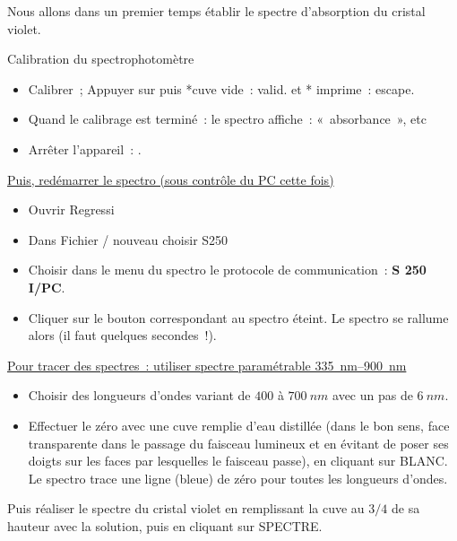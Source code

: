 \documentclass[a4paper, 11pt, final, garamond]{book}
\begin{document}
Nous allons dans un premier temps établir le spectre d'absorption du cristal violet. 

\begin{instruc}{Calibration du spectrophotomètre}
    \begin{itemize}
        \item Calibrer~; Appuyer sur  puis   *cuve vide~: valid. et *
            imprime~: escape.
        \item Quand le calibrage est terminé~: le spectro affiche~:
            «~absorbance~», etc
        \item Arrêter l'appareil~: .
    \end{itemize}
\end{instruc}

\underline{Puis, redémarrer le spectro (sous contrôle du PC cette fois)}
\begin{itemize}
    \item Ouvrir Regressi
    \item Dans Fichier / nouveau choisir S250
    \item Choisir dans le menu du spectro le protocole de communication~:
        \textbf{S 250 I/PC}.
    \item Cliquer sur le bouton correspondant au spectro éteint. Le spectro se
        rallume alors (il faut quelques secondes~!).
\end{itemize}

\underline{Pour tracer des spectres~: utiliser spectre paramétrable
\SIrange{335}{900}{nm}}
\begin{itemize}
    \item Choisir des longueurs d'ondes variant de $400$ à $\SI{700}{nm}$ avec
        un pas de $\SI{6}{nm}$.
    \item Effectuer le zéro avec une cuve remplie d'eau distillée (dans le bon
        sens, face transparente dans le passage du faisceau lumineux et en
        évitant de poser ses doigts sur les faces par lesquelles le faisceau
        passe), en cliquant sur  BLANC. Le spectro trace une ligne (bleue) de
        zéro pour toutes les longueurs d'ondes.
\end{itemize}

Puis réaliser le spectre du cristal violet en remplissant la cuve au
$3/4$ de sa hauteur avec la solution, puis en cliquant sur SPECTRE.

\medskip
\end{document}
